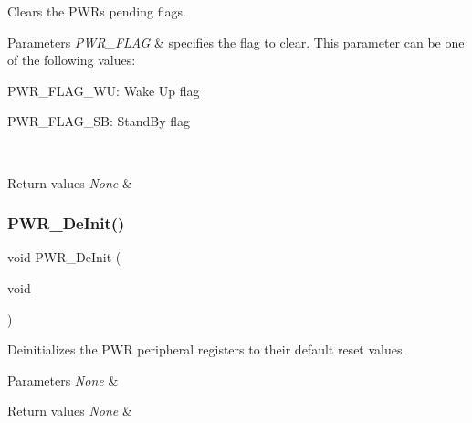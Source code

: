 Clears the P\+WR\textquotesingle{}s pending flags. 


\begin{DoxyParams}{Parameters}
{\em P\+W\+R\+\_\+\+F\+L\+AG} & specifies the flag to clear. This parameter can be one of the following values\+: \begin{DoxyItemize}
\item P\+W\+R\+\_\+\+F\+L\+A\+G\+\_\+\+WU\+: Wake Up flag \item P\+W\+R\+\_\+\+F\+L\+A\+G\+\_\+\+SB\+: Stand\+By flag \end{DoxyItemize}
\\
\hline
\end{DoxyParams}

\begin{DoxyRetVals}{Return values}
{\em None} & \\
\hline
\end{DoxyRetVals}
\mbox{\label{group___p_w_r___private___functions_gad03a0aac7bc3bc3a9fd012f3769a6990}} 
\subsubsection{\texorpdfstring{PWR\_DeInit()}{PWR\_DeInit()}}
{\footnotesize\ttfamily void P\+W\+R\+\_\+\+De\+Init (\begin{DoxyParamCaption}\item[{void}]{ }\end{DoxyParamCaption})}



Deinitializes the P\+WR peripheral registers to their default reset values. 


\begin{DoxyParams}{Parameters}
{\em None} & \\
\hline
\end{DoxyParams}

\begin{DoxyRetVals}{Return values}
{\em None} & \\
\hline
\end{DoxyRetVals}
\mbox{\label{group___p_w_r___private___functions_ga00ddae00a9c327b81b24d2597b0052f3}} 
